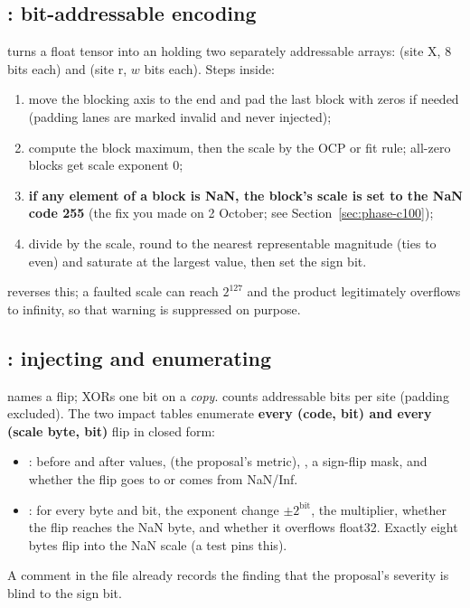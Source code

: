 \subsection{: bit-addressable encoding}
 turns a float tensor into an  holding two separately addressable  arrays:  (site X, 8 bits each) and  (site r, $w$ bits each). Steps inside:
\begin{enumerate}
\item move the blocking axis to the end and pad the last block with zeros if needed (padding lanes are marked invalid and never injected);
\item compute the block maximum, then the scale by the OCP or fit rule; all-zero blocks get scale exponent 0;
\item \textbf{if any element of a block is NaN, the block's scale is set to the NaN code 255} (the fix you made on 2 October; see Section~\ref{sec:phase-c100});
\item divide by the scale, round to the nearest representable magnitude (ties to even) and saturate at the largest value, then set the sign bit.
\end{enumerate}
 reverses this; a faulted scale can reach $2^{127}$ and the product legitimately overflows to infinity, so that warning is suppressed on purpose.

\subsection{: injecting and enumerating}
 names a flip;  XORs one bit on a \emph{copy}.  counts addressable bits per site (padding excluded). The two impact tables enumerate \textbf{every (code, bit) and every (scale byte, bit)} flip in closed form:
\begin{itemize}
\item {}: before and after values,  (the proposal's metric), , a sign-flip mask, and whether the flip goes to or comes from NaN/Inf.
\item {}: for every byte and bit, the exponent change $\pm2^{\mathrm{bit}}$, the multiplier, whether the flip reaches the NaN byte, and whether it overflows float32. Exactly eight bytes flip into the NaN scale (a test pins this).
\end{itemize}
A comment in the file already records the finding that the proposal's severity is blind to the sign bit.

